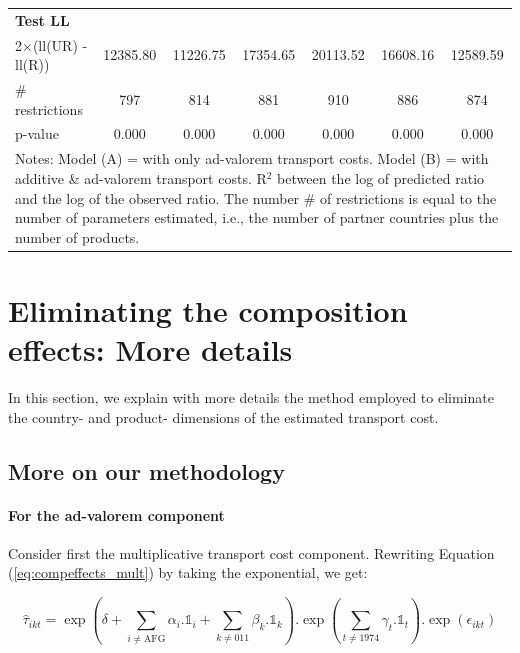 \documentclass[a4paper,11pt]{article}
\begin{document}
\begin{table}[htbp]
\begin{center}
\begin{tabular}{l|cccccc}
\textbf{Test LL} &       &       & & &  & \\
2$\times$(ll(UR) -ll(R)) & 12385.80 & 11226.75 & \multicolumn{1}{c}{17354.65} & \multicolumn{1}{c}{20113.52} & \multicolumn{1}{c}{16608.16} & \multicolumn{1}{c}{12589.59} \\
\# restrictions  & 797   & 814   & \multicolumn{1}{c}{881} & \multicolumn{1}{c}{910} & \multicolumn{1}{c}{886} & \multicolumn{1}{c}{874} \\
p-value & 0.000 & 0.000 & \multicolumn{1}{c}{0.000} & \multicolumn{1}{c}{0.000} & \multicolumn{1}{c}{0.000} & \multicolumn{1}{c}{0.000} \\
\hline\hline
\multicolumn{7}{l}{\parbox[l]{15cm}{ \vspace{7pt}\scriptsize{Notes: Model (A) = with only ad-valorem transport costs. Model (B) = with additive \& ad-valorem
transport costs. R$^{2}$ between the log of predicted ratio and the log of the observed ratio. The number \# of restrictions is equal to the number of parameters estimated, i.e., the number of partner countries plus the number of products.}}}
\end{tabular}%
\end{center}
\end{table}%


\section{Eliminating the composition effects: More details \label{app:comp-effects}}

In this section, we explain with more details the method employed to eliminate the country- and product- dimensions of the estimated transport cost.

\subsection{More on our methodology}
\paragraph{For the ad-valorem component} Consider first the multiplicative transport cost component. Rewriting Equation (\ref{eq:compeffects_mult}) by taking the exponential, we get:

\begin{equation*}
\widehat{\tau}_{ikt}=\exp\left(\delta + \sum_{i \neq \text{AFG}}\alpha_i.\mathbb{1}_i+\sum_{k\neq \text{011}}\beta_k.\mathbb{1}_k\right).\exp\left(\sum_{t \neq 1974}\gamma_t.\mathbb{1}_t\right) .\exp\left(\epsilon_{ikt}\right)
\end{equation*}
\end{document}
